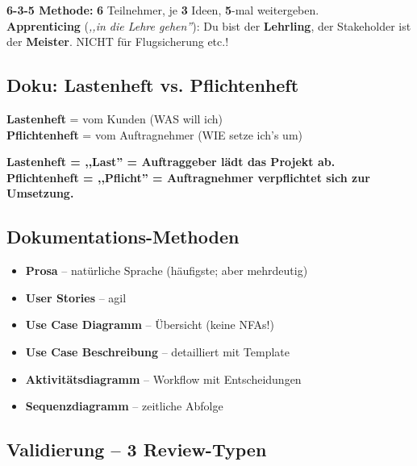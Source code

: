 \documentclass[11pt,a4paper]{article}
\begin{document}
\begin{merkhilfe}
\textbf{6-3-5 Methode:} \textbf{6} Teilnehmer, je \textbf{3} Ideen, \textbf{5}-mal weitergeben.\\
\textbf{Apprenticing} (\emph{,,in die Lehre gehen''}): Du bist der \textbf{Lehrling}, der Stakeholder ist der \textbf{Meister}. NICHT für Flugsicherung etc.!
\end{merkhilfe}

\subsection{Doku: Lastenheft vs. Pflichtenheft}

\begin{tldr}
\textbf{Lastenheft} = vom Kunden (WAS will ich)\\
\textbf{Pflichtenheft} = vom Auftragnehmer (WIE setze ich's um)
\end{tldr}

\begin{merkhilfe}
\textbf{Lastenheft = ,,Last'' = Auftraggeber lädt das Projekt ab.}\\
\textbf{Pflichtenheft = ,,Pflicht'' = Auftragnehmer verpflichtet sich zur Umsetzung.}
\end{merkhilfe}

\subsection{Dokumentations-Methoden}

\begin{keyfacts}
\begin{itemize}
  \item \textbf{Prosa} -- natürliche Sprache (häufigste; aber mehrdeutig)
  \item \textbf{User Stories} -- agil
  \item \textbf{Use Case Diagramm} -- Übersicht (keine NFAs!)
  \item \textbf{Use Case Beschreibung} -- detailliert mit Template
  \item \textbf{Aktivitätsdiagramm} -- Workflow mit Entscheidungen
  \item \textbf{Sequenzdiagramm} -- zeitliche Abfolge
\end{itemize}
\end{keyfacts}

\subsection{Validierung -- 3 Review-Typen}
\end{document}
